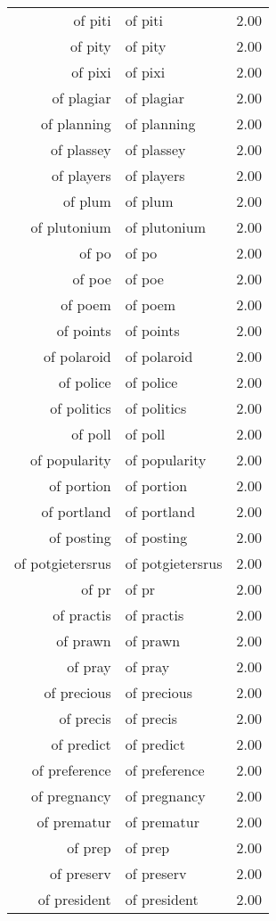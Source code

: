 \begin{table}[ht]
\begin{tabular}{rlr}
  of piti & of piti & 2.00 \\ 
  of pity & of pity & 2.00 \\ 
  of pixi & of pixi & 2.00 \\ 
  of plagiar & of plagiar & 2.00 \\ 
  of planning & of planning & 2.00 \\ 
  of plassey & of plassey & 2.00 \\ 
  of players & of players & 2.00 \\ 
  of plum & of plum & 2.00 \\ 
  of plutonium & of plutonium & 2.00 \\ 
  of po & of po & 2.00 \\ 
  of poe & of poe & 2.00 \\ 
  of poem & of poem & 2.00 \\ 
  of points & of points & 2.00 \\ 
  of polaroid & of polaroid & 2.00 \\ 
  of police & of police & 2.00 \\ 
  of politics & of politics & 2.00 \\ 
  of poll & of poll & 2.00 \\ 
  of popularity & of popularity & 2.00 \\ 
  of portion & of portion & 2.00 \\ 
  of portland & of portland & 2.00 \\ 
  of posting & of posting & 2.00 \\ 
  of potgietersrus & of potgietersrus & 2.00 \\ 
  of pr & of pr & 2.00 \\ 
  of practis & of practis & 2.00 \\ 
  of prawn & of prawn & 2.00 \\ 
  of pray & of pray & 2.00 \\ 
  of precious & of precious & 2.00 \\ 
  of precis & of precis & 2.00 \\ 
  of predict & of predict & 2.00 \\ 
  of preference & of preference & 2.00 \\ 
  of pregnancy & of pregnancy & 2.00 \\ 
  of prematur & of prematur & 2.00 \\ 
  of prep & of prep & 2.00 \\ 
  of preserv & of preserv & 2.00 \\ 
  of president & of president & 2.00 \\ 

\end{tabular}
\end{table}

